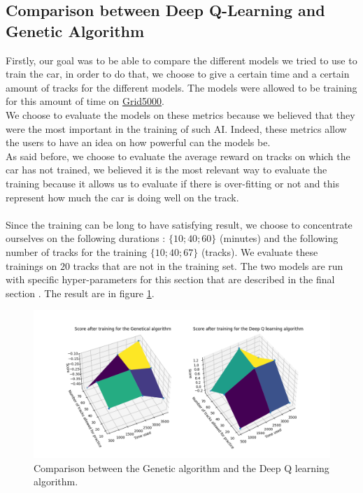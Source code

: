 \documentclass[11pt,a4paper]{article}
\newcounter{fig}
\begin{document}
		\subsection*{Comparison between Deep Q-Learning and Genetic Algorithm}
Firstly, our goal was to be able to compare the different models we tried to use to train the car, in order to do that, we choose to give a certain time and a certain amount of tracks for the different models. The models were allowed to be training for this amount of time on \href{https://www.grid5000.fr}{Grid5000}.\\
We choose to evaluate the models on these metrics because we believed that they were the most important in the training of such AI. Indeed, these metrics allow the users to have an idea on how powerful can the models be.\\
As said before, we choose to evaluate the average reward on tracks on which the car has not trained, we believed it is the most relevant way to evaluate the training because it allows us to evaluate if there is over-fitting or not and this represent how much the car is doing well on the track.\\
\\
Since the training can be long to have satisfying result, we choose to concentrate ourselves on the following durations : $\{10;40;60\}$ (minutes) and the following number of tracks for the training $\{10;40;67\}$ (tracks). We evaluate these trainings on $20$ tracks that are not in the training set. The two models are run with specific hyper-parameters for this section that are described in the final section \pageref{Hyperparameters}. The result are in figure \ref{figure:compare GA VS DQ}.
        \begin{figure}[ht]
            \centering
            \includegraphics[scale = 0.65]{graphe_comparaison.png}
            \caption{Comparison between the Genetic algorithm and the Deep Q learning algorithm.}
            \label{figure:compare GA VS DQ}
        \end{figure}
\end{document}
